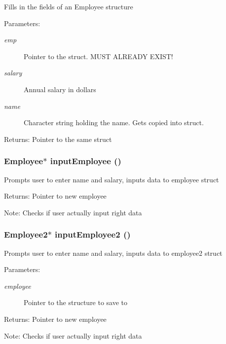 Fills in the fields of an Employee structure \begin{Desc}
\item[Parameters:]
\begin{description}
\item[{\em emp}]Pointer to the struct. MUST ALREADY EXIST! \item[{\em salary}]Annual salary in dollars \item[{\em name}]Character string holding the name. Gets copied into struct. \end{description}
\end{Desc}
\begin{Desc}
\item[Returns:]Pointer to the same struct \end{Desc}
\subsubsection{\setlength{\rightskip}{0pt plus 5cm}\bf{Employee}$\ast$ input\-Employee ()}\label{employee_8h_df7bcba34669423d7f8bdd8c8122ecd3}


Prompts user to enter name and salary, inputs data to employee struct \begin{Desc}
\item[Returns:]Pointer to new employee \end{Desc}
\begin{Desc}
\item[Note:]Checks if user actually input right data \end{Desc}
\subsubsection{\setlength{\rightskip}{0pt plus 5cm}\bf{Employee2}$\ast$ input\-Employee2 ()}\label{employee_8h_4bbd1151cc7051aa5bf412b4b7a75c85}


Prompts user to enter name and salary, inputs data to employee2 struct \begin{Desc}
\item[Parameters:]
\begin{description}
\item[{\em employee}]Pointer to the structure to save to \end{description}
\end{Desc}
\begin{Desc}
\item[Returns:]Pointer to new employee \end{Desc}
\begin{Desc}
\item[Note:]Checks if user actually input right data \end{Desc}
